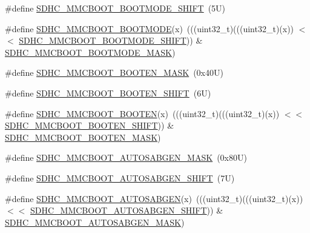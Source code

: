 \begin{DoxyCompactItemize}
\item 
\#define \mbox{\hyperlink{group___s_d_h_c___register___masks_ga2f4f7807f581a3e18d0f1e9f151f74b3}{S\+D\+H\+C\+\_\+\+M\+M\+C\+B\+O\+O\+T\+\_\+\+B\+O\+O\+T\+M\+O\+D\+E\+\_\+\+S\+H\+I\+FT}}~(5\+U)
\item 
\#define \mbox{\hyperlink{group___s_d_h_c___register___masks_gaca4dbba1e965e0daa523dd556db9c965}{S\+D\+H\+C\+\_\+\+M\+M\+C\+B\+O\+O\+T\+\_\+\+B\+O\+O\+T\+M\+O\+DE}}(x)~(((uint32\+\_\+t)(((uint32\+\_\+t)(x)) $<$$<$ \mbox{\hyperlink{group___s_d_h_c___register___masks_ga2f4f7807f581a3e18d0f1e9f151f74b3}{S\+D\+H\+C\+\_\+\+M\+M\+C\+B\+O\+O\+T\+\_\+\+B\+O\+O\+T\+M\+O\+D\+E\+\_\+\+S\+H\+I\+FT}})) \& \mbox{\hyperlink{group___s_d_h_c___register___masks_ga0cdf366302c98d1227b0092048c0ac5a}{S\+D\+H\+C\+\_\+\+M\+M\+C\+B\+O\+O\+T\+\_\+\+B\+O\+O\+T\+M\+O\+D\+E\+\_\+\+M\+A\+SK}})
\item 
\#define \mbox{\hyperlink{group___s_d_h_c___register___masks_ga0e740cc62404161ed68d4ce1ecf30971}{S\+D\+H\+C\+\_\+\+M\+M\+C\+B\+O\+O\+T\+\_\+\+B\+O\+O\+T\+E\+N\+\_\+\+M\+A\+SK}}~(0x40\+U)
\item 
\#define \mbox{\hyperlink{group___s_d_h_c___register___masks_ga1c83fde2fa55c8091ecd1768300614be}{S\+D\+H\+C\+\_\+\+M\+M\+C\+B\+O\+O\+T\+\_\+\+B\+O\+O\+T\+E\+N\+\_\+\+S\+H\+I\+FT}}~(6\+U)
\item 
\#define \mbox{\hyperlink{group___s_d_h_c___register___masks_gaf14823a78d42ca897aa0b567731d196d}{S\+D\+H\+C\+\_\+\+M\+M\+C\+B\+O\+O\+T\+\_\+\+B\+O\+O\+T\+EN}}(x)~(((uint32\+\_\+t)(((uint32\+\_\+t)(x)) $<$$<$ \mbox{\hyperlink{group___s_d_h_c___register___masks_ga1c83fde2fa55c8091ecd1768300614be}{S\+D\+H\+C\+\_\+\+M\+M\+C\+B\+O\+O\+T\+\_\+\+B\+O\+O\+T\+E\+N\+\_\+\+S\+H\+I\+FT}})) \& \mbox{\hyperlink{group___s_d_h_c___register___masks_ga0e740cc62404161ed68d4ce1ecf30971}{S\+D\+H\+C\+\_\+\+M\+M\+C\+B\+O\+O\+T\+\_\+\+B\+O\+O\+T\+E\+N\+\_\+\+M\+A\+SK}})
\item 
\#define \mbox{\hyperlink{group___s_d_h_c___register___masks_gaf80857b20ac681cf157b8012b2cbaaa3}{S\+D\+H\+C\+\_\+\+M\+M\+C\+B\+O\+O\+T\+\_\+\+A\+U\+T\+O\+S\+A\+B\+G\+E\+N\+\_\+\+M\+A\+SK}}~(0x80\+U)
\item 
\#define \mbox{\hyperlink{group___s_d_h_c___register___masks_ga2115330345a0a216c1d1721e84b32ea2}{S\+D\+H\+C\+\_\+\+M\+M\+C\+B\+O\+O\+T\+\_\+\+A\+U\+T\+O\+S\+A\+B\+G\+E\+N\+\_\+\+S\+H\+I\+FT}}~(7\+U)
\item 
\#define \mbox{\hyperlink{group___s_d_h_c___register___masks_gadad54546c471d7e3ad44cc85bd173a2e}{S\+D\+H\+C\+\_\+\+M\+M\+C\+B\+O\+O\+T\+\_\+\+A\+U\+T\+O\+S\+A\+B\+G\+EN}}(x)~(((uint32\+\_\+t)(((uint32\+\_\+t)(x)) $<$$<$ \mbox{\hyperlink{group___s_d_h_c___register___masks_ga2115330345a0a216c1d1721e84b32ea2}{S\+D\+H\+C\+\_\+\+M\+M\+C\+B\+O\+O\+T\+\_\+\+A\+U\+T\+O\+S\+A\+B\+G\+E\+N\+\_\+\+S\+H\+I\+FT}})) \& \mbox{\hyperlink{group___s_d_h_c___register___masks_gaf80857b20ac681cf157b8012b2cbaaa3}{S\+D\+H\+C\+\_\+\+M\+M\+C\+B\+O\+O\+T\+\_\+\+A\+U\+T\+O\+S\+A\+B\+G\+E\+N\+\_\+\+M\+A\+SK}})
$$
\end{DoxyCompactItemize}
